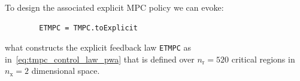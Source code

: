 \documentclass[letterpaper, 10 pt, conference]{ieeeconf}
\begin{document}
	To design the associated explicit MPC policy we can evoke:
	\begin{verbatim}
		ETMPC = TMPC.toExplicit
	\end{verbatim}
	what constructs the explicit feedback law \verb|ETMPC| as in~\eqref{eq:tmpc_control_law_pwa} that is defined over $n_\text{r} = 520$ critical regions in $n_\text{x} = 2$ dimensional space.
	
	
	
	
\end{document}
